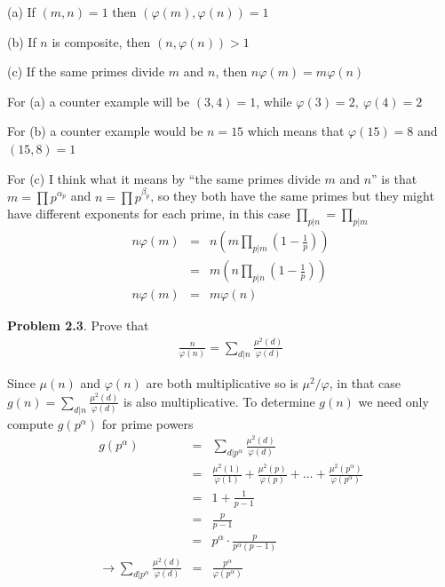 \documentclass[aps,preprint,preprintnumbers,nofootinbib,showpacs,prd]{revtex4-1}
\newcommand{\nbea}{\begin{eqnarray*}}
\newcommand{\neea}{\end{eqnarray*}}
\begin{document}
(a) If $(m,n)=1$ then $(\varphi(m),\varphi(n)) = 1$

(b) If $n$ is composite, then $(n, \varphi(n)) > 1$

(c) If the same primes divide $m$ and $n$, then $n\varphi(m) = m\varphi(n)$

For (a) a counter example will be $(3,4) = 1$, while $\varphi(3) = 2, ~\varphi(4) = 2$

For (b) a counter example would be $n = 15$ which means that $\varphi(15) = 8$ and $(15,8) = 1$

For (c) I think what it means by ``the same primes divide $m$ and $n$'' is that $m = \prod p^{\alpha_p}$ and $n = \prod p^{\beta_p}$, so they both have the same primes but they might have different exponents for each prime, in this case $\prod_{p|n} = \prod_{p|m}$
%
\nbea
n\varphi(m) & = & n \left ( m \prod_{p|m} \left ( 1 - \frac{1}{p}\right ) \right ) \\
& = & m \left ( n \prod_{p|n} \left ( 1 - \frac{1}{p}\right ) \right ) \\
n\varphi(m) & = & m\varphi(n)
\neea
%

{\bf Problem 2.3}. Prove that
%
\nbea
\frac{n}{\varphi(n)} = \sum_{d|n} \frac{\mu^2(d)}{\varphi(d)}
\neea
%

Since $\mu(n)$ and $\varphi(n)$ are both multiplicative so is $\mu^2/\varphi$, in that case $g(n) = \sum_{d|n} \frac{\mu^2(d)}{\varphi(d)}$ is also multiplicative. To determine $g(n)$ we need only compute $g(p^\alpha)$ for prime powers
%
\nbea
g(p^\alpha) & = & \sum_{d|p^\alpha} \frac{\mu^2(d)}{\varphi(d)} \\
& = & \frac{\mu^2(1)}{\varphi(1)} + \frac{\mu^2(p)}{\varphi(p)} + \ldots + \frac{\mu^2(p^\alpha)}{\varphi(p^\alpha)} \\
& = & 1 + \frac{1}{p - 1} \\
& = & \frac{p}{p - 1} \\
& = & p^\alpha \cdot \frac{p}{p^\alpha(p - 1)} \\
\to \sum_{d|p^\alpha} \frac{\mu^2(d)}{\varphi(d)}& = & \frac{p^\alpha}{\varphi(p^\alpha)}
\neea
%
\end{document}
